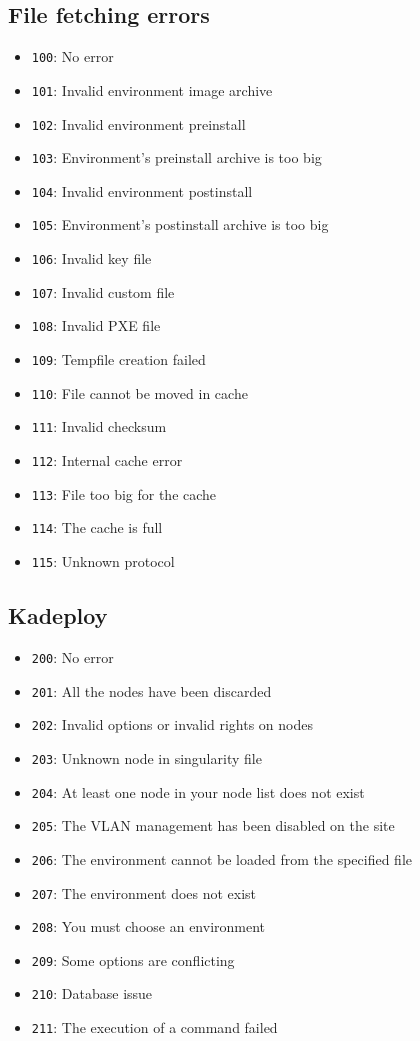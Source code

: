 \documentclass[a4wide,10pt,oneside]{book}
\begin{document}
\subsection{File fetching errors}
\begin{itemize}
  \item \texttt{100}: No error
  \item \texttt{101}: Invalid environment image archive
  \item \texttt{102}: Invalid environment preinstall
  \item \texttt{103}: Environment's preinstall archive is too big
  \item \texttt{104}: Invalid environment postinstall
  \item \texttt{105}: Environment's postinstall archive is too big
  \item \texttt{106}: Invalid key file
  \item \texttt{107}: Invalid custom file
  \item \texttt{108}: Invalid PXE file
  \item \texttt{109}: Tempfile creation failed
  \item \texttt{110}: File cannot be moved in cache
  \item \texttt{111}: Invalid checksum
  \item \texttt{112}: Internal cache error
  \item \texttt{113}: File too big for the cache
  \item \texttt{114}: The cache is full
  \item \texttt{115}: Unknown protocol
\end{itemize}
\subsection{Kadeploy}
\begin{itemize}
  \item \texttt{200}: No error
  \item \texttt{201}: All the nodes have been discarded
  \item \texttt{202}: Invalid options or invalid rights on nodes
  \item \texttt{203}: Unknown node in singularity file
  \item \texttt{204}: At least one node in your node list does not exist
  \item \texttt{205}: The VLAN management has been disabled on the site
  \item \texttt{206}: The environment cannot be loaded from the specified file
  \item \texttt{207}: The environment does not exist
  \item \texttt{208}: You must choose an environment
  \item \texttt{209}: Some options are conflicting
  \item \texttt{210}: Database issue
  \item \texttt{211}: The execution of a command failed
\end{itemize}
\end{document}
